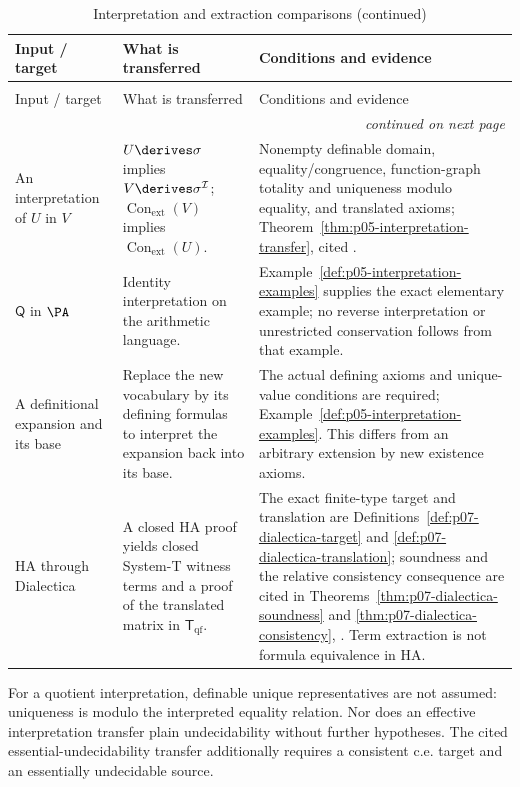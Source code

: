 \begingroup\small
\begin{longtable}{@{}p{}p{}p{}@{}}
\caption{Interpretation and extraction comparisons.}
\label{tab:p14-strength-interpretations}\\
\toprule
Input / target & What is transferred & Conditions and evidence \\
\midrule
\endfirsthead
\caption[]{Interpretation and extraction comparisons (continued)}\\
\toprule
Input / target & What is transferred & Conditions and evidence \\
\midrule
\endhead
\midrule\multicolumn{3}{r}{\emph{continued on next page}}\\
\endfoot
\endlastfoot
An interpretation of \(U\) in \(V\) &
\(U\derives\sigma\) implies \(V\derives\sigma^{\mathcal I}\);
\(\operatorname{Con}_{\mathrm{ext}}(V)\) implies
\(\operatorname{Con}_{\mathrm{ext}}(U)\). &
Nonempty definable domain, equality/congruence, function-graph totality and
uniqueness modulo equality, and translated axioms;
Theorem~\ref{thm:p05-interpretation-transfer}, cited \cite{TMR1953}. \\
\addlinespace
\(\mathsf Q\) in \(\PA\) & Identity interpretation on the arithmetic
language. & Example~\ref{def:p05-interpretation-examples} supplies the
exact elementary example; no reverse interpretation or unrestricted
conservation follows from that example. \\
\addlinespace
A definitional expansion and its base &
Replace the new vocabulary by its defining formulas to interpret the
expansion back into its base. &
The actual defining axioms and unique-value conditions are required;
Example~\ref{def:p05-interpretation-examples}. This differs from an
arbitrary extension by new existence axioms. \\
\addlinespace
HA through Dialectica &
A closed HA proof yields closed System-T witness terms and a proof of the
translated matrix in \(\mathsf T_{\mathrm{qf}}\). &
The exact finite-type target and translation are
Definitions~\ref{def:p07-dialectica-target} and
\ref{def:p07-dialectica-translation}; soundness and the relative consistency
consequence are cited in Theorems~\ref{thm:p07-dialectica-soundness} and
\ref{thm:p07-dialectica-consistency}, \cite{AvigadFeferman1998}.
Term extraction is not formula equivalence in HA. \\
\bottomrule
\end{longtable}
\endgroup

For a quotient interpretation, definable unique representatives are not
assumed: uniqueness is modulo the interpreted equality relation. Nor does
an effective interpretation transfer plain undecidability without further
hypotheses. The cited essential-undecidability transfer additionally requires
a consistent c.e. target and an essentially undecidable source.

